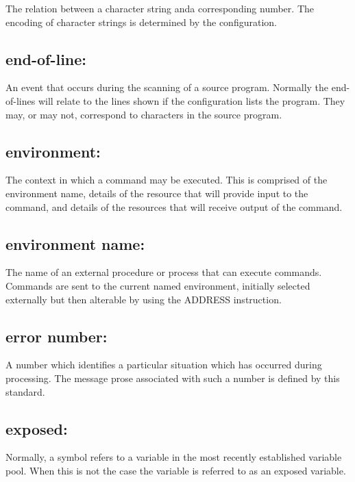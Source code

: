 The relation between a character string anda corresponding number. The
encoding of character strings is determined by the configuration.

\hypertarget{end-of-line}{%
\subsection{end-of-line:}\label{end-of-line}}

An event that occurs during the scanning of a source program. Normally
the end-of-lines will relate to the lines shown if the configuration
lists the program. They may, or may not, correspond to characters in the
source program.

\hypertarget{environment}{%
\subsection{environment:}\label{environment}}

The context in which a command may be executed. This is comprised of the
environment name, details of the resource that will provide input to the
command, and details of the resources that will receive output of the
command.

\hypertarget{environment-name}{%
\subsection{environment name:}\label{environment-name}}

The name of an external procedure or process that can execute commands.
Commands are sent to the current named environment, initially selected
externally but then alterable by using the ADDRESS instruction.

\hypertarget{error-number}{%
\subsection{error number:}\label{error-number}}

A number which identifies a particular situation which has occurred
during processing. The message prose associated with such a number is
defined by this standard.

\hypertarget{exposed}{%
\subsection{exposed:}\label{exposed}}

Normally, a symbol refers to a variable in the most recently established
variable pool. When this is not the case the variable is referred to as
an exposed variable.

